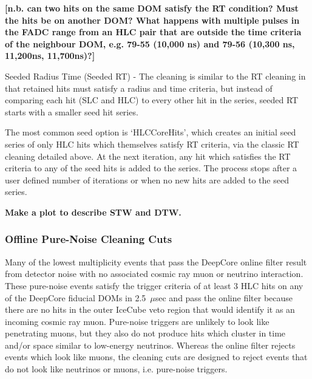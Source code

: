 \documentclass[../Main.tex]{subfiles}
\begin{document}
\textbf{[n.b. can two hits on the same DOM satisfy the RT 
condition? Must the hits be on another DOM? What happens with multiple
pulses in the FADC range from an HLC pair that are outside the time
criteria of the neighbour DOM, e.g. 79-55 (10,000 ns) and 79-56 (10,300
ns, 11,200ns, 11,700ns)?]}

Seeded Radius Time (Seeded RT) - The cleaning is similar to the
RT cleaning in that retained hits must satisfy a radius and time
criteria, but instead of comparing each hit (SLC and HLC) to every 
other hit in the series, seeded RT starts with a smaller seed hit
series. 

The most common seed option is `HLCCoreHits', which creates an initial seed
series of only HLC hits which themselves satisfy RT 
criteria, via the classic RT cleaning detailed above. At the next
iteration, any hit which satisfies the RT criteria to any of the seed
hits is added to the series. The process stops after a user defined
number of iterations or when no new hits are added to the seed
series.



\textbf{Make a plot to describe STW and DTW. }

\subsubsection{Offline Pure-Noise Cleaning Cuts}\label{sec:L3Cleaning}

Many of the lowest multiplicity events that pass the DeepCore online filter
result from detector noise with no associated cosmic ray muon or
neutrino interaction.  These pure-noise events satisfy the trigger criteria of at least 3 HLC
hits on any of the DeepCore fiducial DOMs in 2.5~$\mu$sec and pass
the online filter because there are no hits in the outer IceCube veto
region that would identify it as an incoming cosmic ray
muon. Pure-noise triggers are unlikely to look like penetrating muons,
but they also do not produce hits which cluster in time and/or
space similar to low-energy neutrinos. Whereas the online filter
rejects events which look like muons, the cleaning cuts are designed
to reject events that do not look like neutrinos or muons,
i.e. pure-noise triggers.
\end{document}
